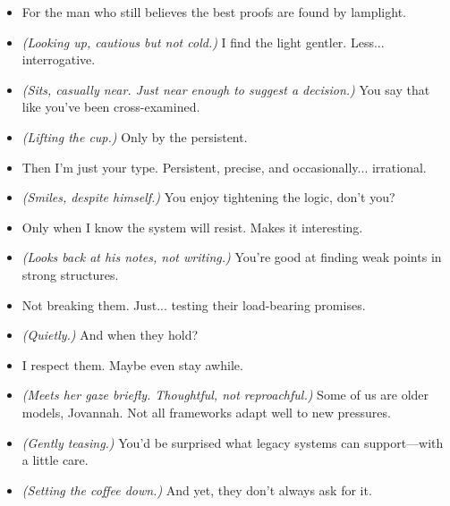 \begin{itemize}
    \item[\textbf{Jovannah:}] For the man who still believes the best proofs are found by lamplight.

    \item[\textbf{Willard:}] \textit{(Looking up, cautious but not cold.)} I find the light gentler. Less... interrogative.

    \item[\textbf{Jovannah:}] \textit{(Sits, casually near. Just near enough to suggest a decision.)} You say that like you’ve been cross-examined.

    \item[\textbf{Willard:}] \textit{(Lifting the cup.)} Only by the persistent.

    \item[\textbf{Jovannah:}] Then I’m just your type. Persistent, precise, and occasionally... irrational.

    \item[\textbf{Willard:}] \textit{(Smiles, despite himself.)} You enjoy tightening the logic, don’t you?

    \item[\textbf{Jovannah:}] Only when I know the system will resist. Makes it interesting.

    \item[\textbf{Willard:}] \textit{(Looks back at his notes, not writing.)} You’re good at finding weak points in strong structures.

    \item[\textbf{Jovannah:}] Not breaking them. Just... testing their load-bearing promises.

    \item[\textbf{Willard:}] \textit{(Quietly.)} And when they hold?

    \item[\textbf{Jovannah:}] I respect them. Maybe even stay awhile.

    \item[\textbf{Willard:}] \textit{(Meets her gaze briefly. Thoughtful, not reproachful.)} Some of us are older models, Jovannah. Not all frameworks adapt well to new pressures.

    \item[\textbf{Jovannah:}] \textit{(Gently teasing.)} You’d be surprised what legacy systems can support—with a little care.

    \item[\textbf{Willard:}] \textit{(Setting the coffee down.)} And yet, they don’t always ask for it.


\end{itemize}
